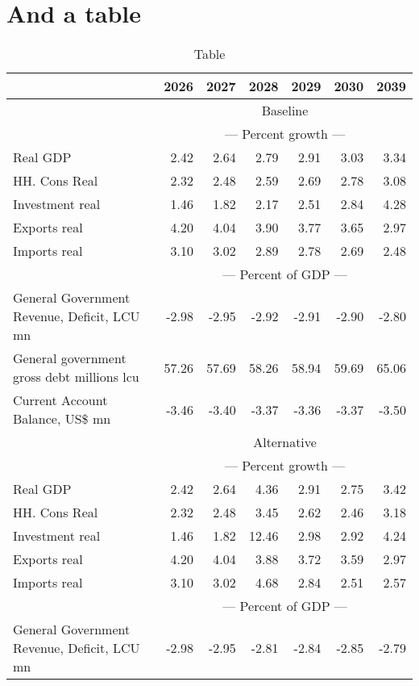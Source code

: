\documentclass{article}
\begin{document}
\section{And a table}
\begin{table}[ht]
\caption*{Table}
\begin{tabular}{lrrrrr|r}
\toprule
 & 2026 & 2027 & 2028 & 2029 & 2030 & 2039 \\
\midrule
&\multicolumn{6}{c}{{Baseline}}                               \\
&\multicolumn{6}{c}{{--- Percent growth ---}}                               \\
Real GDP & 2.42 & 2.64 & 2.79 & 2.91 & 3.03 & 3.34 \\
HH. Cons Real & 2.32 & 2.48 & 2.59 & 2.69 & 2.78 & 3.08 \\
Investment real & 1.46 & 1.82 & 2.17 & 2.51 & 2.84 & 4.28 \\
Exports real & 4.20 & 4.04 & 3.90 & 3.77 & 3.65 & 2.97 \\
Imports real & 3.10 & 3.02 & 2.89 & 2.78 & 2.69 & 2.48 \\
&\multicolumn{6}{c}{{--- Percent of GDP ---}}                               \\
General Government Revenue, Deficit, LCU mn & -2.98 & -2.95 & -2.92 & -2.91 & -2.90 & -2.80 \\
General government gross debt millions lcu & 57.26 & 57.69 & 58.26 & 58.94 & 59.69 & 65.06 \\
Current Account Balance, US\$ mn & -3.46 & -3.40 & -3.37 & -3.36 & -3.37 & -3.50 \\
&\multicolumn{6}{c}{{Alternative}}                               \\
&\multicolumn{6}{c}{{--- Percent growth ---}}                               \\
Real GDP & 2.42 & 2.64 & 4.36 & 2.91 & 2.75 & 3.42 \\
HH. Cons Real & 2.32 & 2.48 & 3.45 & 2.62 & 2.46 & 3.18 \\
Investment real & 1.46 & 1.82 & 12.46 & 2.98 & 2.92 & 4.24 \\
Exports real & 4.20 & 4.04 & 3.88 & 3.72 & 3.59 & 2.97 \\
Imports real & 3.10 & 3.02 & 4.68 & 2.84 & 2.51 & 2.57 \\
&\multicolumn{6}{c}{{--- Percent of GDP ---}}                               \\
General Government Revenue, Deficit, LCU mn & -2.98 & -2.95 & -2.81 & -2.84 & -2.85 & -2.79 \\

\end{tabular}
\end{table}
\end{document}
